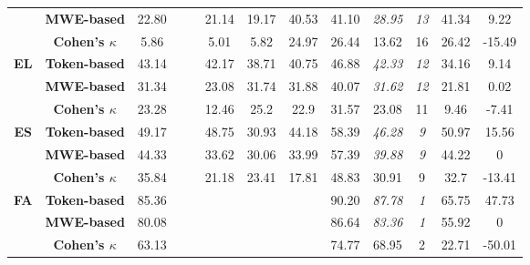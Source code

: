 \documentclass[output=paper
,modfonts
,nonflat,draftmode]{langsci/langscibook}
\begin{document}
\begin{table}
{\begin{tabular}{ccccccccccccc}
 & \textbf{\scriptsize{}MWE-based} & {\scriptsize{}22.80} &  &  & {\scriptsize{}21.14} & {\scriptsize{}19.17} & {\scriptsize{}40.53} & {\scriptsize{}41.10} & \emph{\scriptsize{}28.95} & \textit{\scriptsize{}13} & {\scriptsize{}41.34} & {\scriptsize{}9.22}\tabularnewline
  & \textbf{\scriptsize{}Cohen's $\kappa$} &\scriptsize{5.86}  &\scriptsize{}  &\scriptsize{}  & \scriptsize{5.01} &\scriptsize{5.82}  &\scriptsize{24.97}  &\scriptsize{26.44} &\scriptsize{13.62}  &\scriptsize{16} & \scriptsize{26.42} &\scriptsize{-15.49}  \tabularnewline
\midrule 
\textbf{\scriptsize{}EL} & \textbf{\scriptsize{}Token-based} & {\scriptsize{}43.14} &  &  & {\scriptsize{}42.17} & {\scriptsize{}38.71} & {\scriptsize{}40.75} & {\scriptsize{}46.88} & \emph{\scriptsize{}42.33} & \textit{\scriptsize{}12} & {\scriptsize{}34.16} & {\scriptsize{}9.14}\tabularnewline
 & \textbf{\scriptsize{}MWE-based} & {\scriptsize{}31.34} &  &  & {\scriptsize{}23.08} & {\scriptsize{}31.74} & {\scriptsize{}31.88} & {\scriptsize{}40.07} & \emph{\scriptsize{}31.62} & \textit{\scriptsize{}12} & {\scriptsize{}21.81} & {\scriptsize{}0.02}\tabularnewline
   & \textbf{\scriptsize{}Cohen's $\kappa$} &\scriptsize{23.28}  &\scriptsize{}  &\scriptsize{}  & \scriptsize{12.46} &\scriptsize{25.2}  &\scriptsize{22.9}  &\scriptsize{31.57} &\scriptsize{23.08}  &\scriptsize{11} & \scriptsize{9.46} &\scriptsize{-7.41}  \tabularnewline
\midrule 

\textbf{\scriptsize{}ES} & \textbf{\scriptsize{}Token-based} & {\scriptsize{}49.17} &  &  & {\scriptsize{}48.75} & {\scriptsize{}30.93} & {\scriptsize{}44.18} & {\scriptsize{}58.39} & \emph{\scriptsize{}46.28} & \textit{\scriptsize{}9} & {\scriptsize{}50.97} & {\scriptsize{}15.56}\tabularnewline
 & \textbf{\scriptsize{}MWE-based} & {\scriptsize{}44.33} &  &  & {\scriptsize{}33.62} & {\scriptsize{}30.06} & {\scriptsize{}33.99} & {\scriptsize{}57.39} & \emph{\scriptsize{}39.88} & \textit{\scriptsize{}9} & {\scriptsize{}44.22} & {\scriptsize{}0}\tabularnewline
   & \textbf{\scriptsize{}Cohen's $\kappa$} &\scriptsize{35.84}&\scriptsize{}  &\scriptsize{}  & \scriptsize{21.18} &\scriptsize{23.41}  &\scriptsize{17.81}  &\scriptsize{48.83} &\scriptsize{30.91}  &\scriptsize{9} & \scriptsize{32.7} &\scriptsize{-13.41}  \tabularnewline
\midrule 

\textbf{\scriptsize{}FA} & \textbf{\scriptsize{}Token-based} & {\scriptsize{}85.36} &  &  &  &  &  & {\scriptsize{}90.20} & \emph{\scriptsize{}87.78} & \textit{\scriptsize{}1} & {\scriptsize{}65.75} & {\scriptsize{}47.73}\tabularnewline
 & \textbf{\scriptsize{}MWE-based} & {\scriptsize{}80.08} &  &  &  &  &  & {\scriptsize{}86.64} & \emph{\scriptsize{}83.36} & \textit{\scriptsize{}1} & {\scriptsize{}55.92} & {\scriptsize{}0}\tabularnewline
    & \textbf{\scriptsize{}Cohen's $\kappa$} &\scriptsize{63.13} &\scriptsize{}  &\scriptsize{}  & \scriptsize{} &\scriptsize{}  &\scriptsize{}  &\scriptsize{74.77} &\scriptsize{68.95}  &\scriptsize{2} & \scriptsize{22.71} &\scriptsize{-50.01}  \tabularnewline
\midrule 


\end{tabular}}
\end{table}
\end{document}
